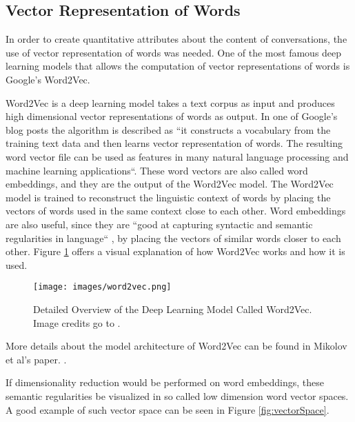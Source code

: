 \documentclass[11pt]{article}
\begin{document}

\subsection{Vector Representation of Words}
In order to create quantitative attributes about the content of conversations, the use of vector representation of words was needed. One of the most famous deep learning models that allows the computation of vector representations of words is Google's Word2Vec.

Word2Vec is a deep learning model takes a text corpus as input and produces high dimensional vector representations of words as output. In one of Google's blog posts the algorithm is described as ``it constructs a vocabulary from the training text data and then learns vector representation of words. The resulting word vector file can be used as features in many natural language processing and machine learning applications``\cite{mikolov_2013}. 
These word vectors are also called word embeddings, and they are the output of the Word2Vec model. The Word2Vec model is trained to reconstruct the linguistic context of words by placing the vectors of words used in the same context close to each other. Word embeddings are also useful, since they are ``good at capturing syntactic and semantic regularities in language`` \cite{mikolov2013linguistic}, by placing the vectors of similar words closer to each other. Figure \ref{fig:word2vec} offers a visual explanation of how Word2Vec works and how it is used.

\begin{figure}[h!]
    \centering
    \texttt{[image: images/word2vec.png]}
    \caption{Detailed Overview of the Deep Learning Model Called Word2Vec. Image credits go to \cite{Kevin2015}.}
    \label{fig:word2vec}
\end{figure}

More details about the model architecture of Word2Vec can be found in Mikolov et al's paper. \cite{mikolov2013efficient}.

If dimensionality reduction would be performed on word embeddings, these semantic regularities be visualized in so called low dimension word vector spaces. A good example of such vector space can be seen in Figure \ref{fig:vectorSpace}.
\end{document}
